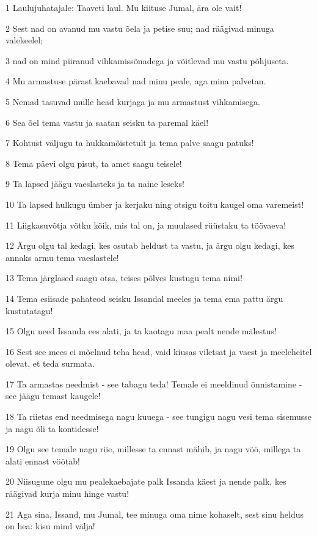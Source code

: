 \par 1 Laulujuhatajale: Taaveti laul. Mu kiituse Jumal, ära ole vait!
\par 2 Sest nad on avanud mu vastu õela ja petise suu; nad räägivad minuga valekeelel;
\par 3 nad on mind piiranud vihkamissõnadega ja võitlevad mu vastu põhjuseta.
\par 4 Mu armastuse pärast kaebavad nad minu peale, aga mina palvetan.
\par 5 Nemad tasuvad mulle head kurjaga ja mu armastust vihkamisega.
\par 6 Sea õel tema vastu ja saatan seisku ta paremal käel!
\par 7 Kohtust väljugu ta hukkamõistetult ja tema palve saagu patuks!
\par 8 Tema päevi olgu pisut, ta amet saagu teisele!
\par 9 Ta lapsed jäägu vaeslasteks ja ta naine leseks!
\par 10 Ta lapsed hulkugu ümber ja kerjaku ning otsigu toitu kaugel oma varemeist!
\par 11 Liigkasuvõtja võtku kõik, mis tal on, ja muulased rüüstaku ta töövaeva!
\par 12 Ärgu olgu tal kedagi, kes osutab heldust ta vastu, ja ärgu olgu kedagi, kes annaks armu tema vaeslastele!
\par 13 Tema järglased saagu otsa, teises põlves kustugu tema nimi!
\par 14 Tema esiisade pahateod seisku Issandal meeles ja tema ema pattu ärgu kustutatagu!
\par 15 Olgu need Issanda ees alati, ja ta kaotagu maa pealt nende mälestus!
\par 16 Sest see mees ei mõelnud teha head, vaid kiusas viletsat ja vaest ja meeleheitel olevat, et teda surmata.
\par 17 Ta armastas needmist - see tabagu teda! Temale ei meeldinud õnnistamine - see jäägu temast kaugele!
\par 18 Ta riietas end needmisega nagu kuuega - see tungigu nagu vesi tema sisemusse ja nagu õli ta kontidesse!
\par 19 Olgu see temale nagu riie, millesse ta ennast mähib, ja nagu vöö, millega ta alati ennast vöötab!
\par 20 Niisugune olgu mu pealekaebajate palk Issanda käest ja nende palk, kes räägivad kurja minu hinge vastu!
\par 21 Aga sina, Issand, mu Jumal, tee minuga oma nime kohaselt, sest sinu heldus on hea: kisu mind välja!
